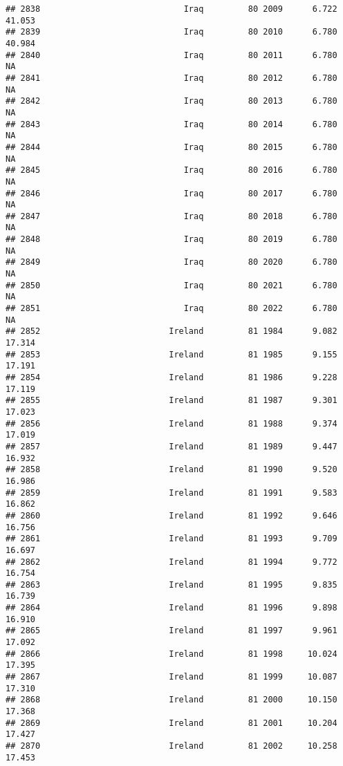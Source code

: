 \documentclass[
]{article}
\begin{document}
\begin{verbatim}
## 2838                             Iraq         80 2009      6.722     41.053
## 2839                             Iraq         80 2010      6.780     40.984
## 2840                             Iraq         80 2011      6.780         NA
## 2841                             Iraq         80 2012      6.780         NA
## 2842                             Iraq         80 2013      6.780         NA
## 2843                             Iraq         80 2014      6.780         NA
## 2844                             Iraq         80 2015      6.780         NA
## 2845                             Iraq         80 2016      6.780         NA
## 2846                             Iraq         80 2017      6.780         NA
## 2847                             Iraq         80 2018      6.780         NA
## 2848                             Iraq         80 2019      6.780         NA
## 2849                             Iraq         80 2020      6.780         NA
## 2850                             Iraq         80 2021      6.780         NA
## 2851                             Iraq         80 2022      6.780         NA
## 2852                          Ireland         81 1984      9.082     17.314
## 2853                          Ireland         81 1985      9.155     17.191
## 2854                          Ireland         81 1986      9.228     17.119
## 2855                          Ireland         81 1987      9.301     17.023
## 2856                          Ireland         81 1988      9.374     17.019
## 2857                          Ireland         81 1989      9.447     16.932
## 2858                          Ireland         81 1990      9.520     16.986
## 2859                          Ireland         81 1991      9.583     16.862
## 2860                          Ireland         81 1992      9.646     16.756
## 2861                          Ireland         81 1993      9.709     16.697
## 2862                          Ireland         81 1994      9.772     16.754
## 2863                          Ireland         81 1995      9.835     16.739
## 2864                          Ireland         81 1996      9.898     16.910
## 2865                          Ireland         81 1997      9.961     17.092
## 2866                          Ireland         81 1998     10.024     17.395
## 2867                          Ireland         81 1999     10.087     17.310
## 2868                          Ireland         81 2000     10.150     17.368
## 2869                          Ireland         81 2001     10.204     17.427
## 2870                          Ireland         81 2002     10.258     17.453

\end{verbatim}
\end{document}
